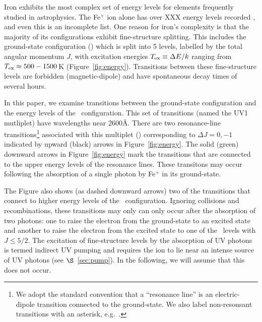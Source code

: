 \documentclass[12pt,preprint]{aastex}
\begin{document}
Iron exhibits the most complex set of energy levels for elements
frequently studied in astrophysics.  The Fe$^+$ ion alone has over XXX
energy levels recorded \citep{iron}, and even this is an
incomplete list.  
One reason for iron's complexity is
that the majority of its configurations exhibit fine-structure splitting.
This includes the ground-state configuration (\aconfig) which is split
into 5 levels, 
labelled by the total angular momentum $J$, 
with excitation energies $T_{\rm ex} \equiv \Delta E / k$ ranging from
$T_{\rm ex} \approx 500-1500$\,K (Figure~\ref{fig:energy}).  
Transitions between these fine-structure levels are 
forbidden (magnetic-dipole) and have spontaneous decay times of several hours.  

In this paper, we examine transitions between the ground-state
configuration and the energy levels of the \zconfig\
configuration.  This set of transitions (named the
UV1 mutliplet) have wavelengths near 2600\AA.
There are two resonance-line transitions\footnote{We adopt the
  standard convention that a ``resonance line'' is an electric-dipole
  transition connected to the ground-state.  We also label
  non-resonsant transitions with an asterisk, e.g.\ \feiic.} 
associated with this multiplet (\feiid)
corresponding to $\Delta J = 0, -1$ indicated by upward (black) arrows
in Figure~\ref{fig:energy}. The solid (green) downward
arrows in Figure~\ref{fig:energy} mark the transitions that are
connected to
the upper energy levels of the resonance lines.  These transitons may
occur following the absorption of a single photon by Fe$^+$ in its
ground-state.  

The Figure also shows (as dashed downward arrows) two of the
transitions that connect to higher energy levels of the \zconfig\
configuration.  Ignoring collisions and recombinations, these
transitions may only can only occur after the absorption
of two photons: one to raise the electron from the ground-state to an
excited state and another to raise the electron from the excited state
to one of the \zconfig\ levels with $J \le 5/2$.  The excitation of
fine-structure levels by 
the absorption of UV photons is termed indirect UV pumping
\citep[e.g][]{silva02,pcb06} and requires the ion to lie
near an intense source of UV photons (see $\S$~\ref{sec:pump}).  In the
following, we will assume that this does not occur. 
\end{document}
